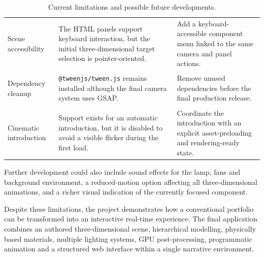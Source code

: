 \documentclass{report}
\begin{document}
\begin{table}[ht]
\begin{tabularx}{\textwidth}{
        @{}
        >{\bfseries\raggedright\arraybackslash}p{}
        >{\raggedright\arraybackslash}p{}
        >{\raggedright\arraybackslash}X
        @{}
    }
        Scene accessibility
        &
        The HTML panels support keyboard interaction, but the initial
        three-dimensional target selection is pointer-oriented.
        &
        Add a keyboard-accessible component menu linked to the same
        camera and panel actions.
        \\

        Dependency cleanup
        &
        \texttt{@tweenjs/tween.js} remains installed although the final
        camera system uses GSAP.
        &
        Remove unused dependencies before the final production release.
        \\

        Cinematic introduction
        &
        Support exists for an automatic introduction, but it is disabled
        to avoid a visible flicker during the first load.
        &
        Coordinate the introduction with an explicit asset-preloading
        and rendering-ready state.
        \\

        \bottomrule
    \end{tabularx}

    \caption{Current limitations and possible future developments.}
    \label{tab:future-improvements}
\end{table}

Further development could also include sound effects for the lamp, fans
and background environment, a reduced-motion option affecting all
three-dimensional animations, and a richer visual indication of the
currently focused component.

Despite these limitations, the project demonstrates how a conventional
portfolio can be transformed into an interactive real-time experience.
The final application combines an authored three-dimensional scene,
hierarchical modelling, physically based materials, multiple lighting
systems, GPU post-processing, programmatic animation and a structured
web interface within a single narrative environment.
\end{document}

